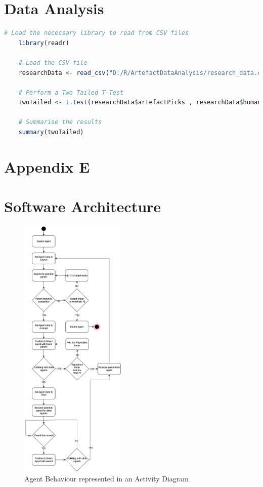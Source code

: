 \section*{Data Analysis}
\label{append:d}
\begin{lstlisting}[language=R, caption = Example R code for a Two Tailed T-Test using data from an imported CSV file]
    # Load the necessary library to read from CSV files
    library(readr)

    # Load the CSV file
    researchData <- read_csv("D:/R/ArtefactDataAnalysis/research_data.csv")

    # Perform a Two Tailed T-Test
    twoTailed <- t.test(researchData$artefactPicks , researchData$humanPicks)

    # Summarise the results
    summary(twoTailed)
\end{lstlisting}


\newpage
\section*{Appendix E}
\section*{Software Architecture}
\label{append:e}
\begin{figure}[ht]
    \includegraphics[width=0.45\textwidth]{./Images/AgentActivityDiagram.png}
    \centering
    \caption{Agent Behaviour represented in an Activity Diagram}
    \label{activity-diagram}
\end{figure}

